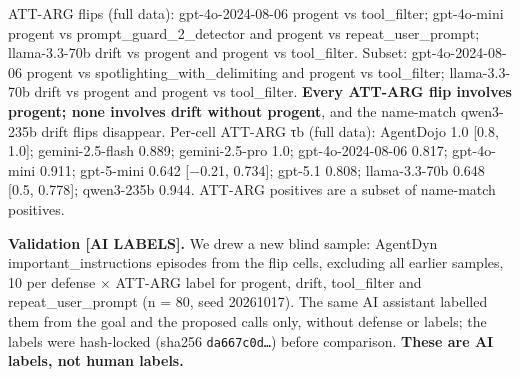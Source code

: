 \documentclass[11pt]{article}
\begin{document}
ATT-ARG flips (full data): gpt-4o-2024-08-06 progent vs tool\_filter; gpt-4o-mini progent vs prompt\_guard\_2\_detector and progent vs repeat\_user\_prompt; llama-3.3-70b drift vs progent and progent vs tool\_filter. Subset: gpt-4o-2024-08-06 progent vs spotlighting\_with\_delimiting and progent vs tool\_filter; llama-3.3-70b drift vs progent and progent vs tool\_filter. \textbf{Every ATT-ARG flip involves progent; none involves drift without progent}, and the name-match qwen3-235b drift flips disappear. Per-cell ATT-ARG τb (full data): AgentDojo 1.0 {[}0.8, 1.0{]}; gemini-2.5-flash 0.889; gemini-2.5-pro 1.0; gpt-4o-2024-08-06 0.817; gpt-4o-mini 0.911; gpt-5-mini 0.642 {[}−0.21, 0.734{]}; gpt-5.1 0.808; llama-3.3-70b 0.648 {[}0.5, 0.778{]}; qwen3-235b 0.944. ATT-ARG positives are a subset of name-match positives.

\textbf{Validation {[}AI LABELS{]}.} We drew a new blind sample: AgentDyn important\_instructions episodes from the flip cells, excluding all earlier samples, 10 per defense × ATT-ARG label for progent, drift, tool\_filter and repeat\_user\_prompt (n = 80, seed 20261017). The same AI assistant labelled them from the goal and the proposed calls only, without defense or labels; the labels were hash-locked (sha256 \texttt{da667c0d…}) before comparison. \textbf{These are AI labels, not human labels.}
\end{document}
